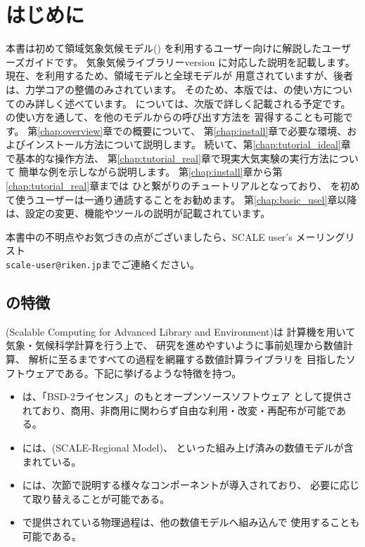 \section{はじめに} \label{sec:introduction}

本書は初めて領域気象気候モデル({\scalerm})
を利用するユーザー向けに解説したユーザーズガイドです。
気象気候ライブラリー\scalelib version \version に対応した説明を記載します。
現在、\scalelib を利用するため、領域モデル\scalerm と全球モデル\scalegm が
用意されていますが、後者は、力学コアの整備のみされています。
そのため、本版では、\scalerm の使い方についてのみ詳しく述べています。
\scalegm については、次版で詳しく記載される予定です。
\scalerm の使い方を通して、\scalelib を他のモデルからの呼び出す方法を
習得することも可能です。
第\ref{chap:overview}章で\scalelib の概要について、
第\ref{chap:install}章で必要な環境、およびインストール方法について説明します。
続いて、第\ref{chap:tutorial_ideal}章で基本的な操作方法、
第\ref{chap:tutorial_real}章で現実大気実験の実行方法について
簡単な例を示しながら説明します。
第\ref{chap:install}章から第\ref{chap:tutorial_real}章までは
ひと繋がりのチュートリアルとなっており、
\scalerm を初めて使うユーザーは一通り通読することをお勧めます。
第\ref{chap:basic_usel}章以降は、設定の変更、機能やツールの説明が記載されています。

本書中の不明点やお気づきの点がございましたら、SCALE user's メーリングリスト\\
 \verb|scale-user@riken.jp|までご連絡ください。



\subsection{\scalelib の特徴} \label{subsec:scale_feature}

\scalelib (Scalable Computing for Advanced Library and Environment)は
計算機を用いて気象・気候科学計算を行う上で、
研究を進めやすいように事前処理から数値計算、
解析に至るまですべての過程を網羅する数値計算ライブラリを
目指したソフトウェアである。下記に挙げるような特徴を持つ。
\begin{itemize}
\item \scalelib は、「BSD-2ライセンス」のもとオープンソースソフトウェア
として提供されており、商用、非商用に関わらず自由な利用・改変・再配布が可能である。
\item \scalelib には、\scalerm (SCALE-Regional Model)、
といった組み上げ済みの数値モデルが含まれている。
\item \scalelib には、次節で説明する様々なコンポーネントが導入されており、
必要に応じて取り替えることが可能である。
\item \scalelib で提供されている物理過程は、他の数値モデルへ組み込んで
使用することも可能である。
\end{itemize}

